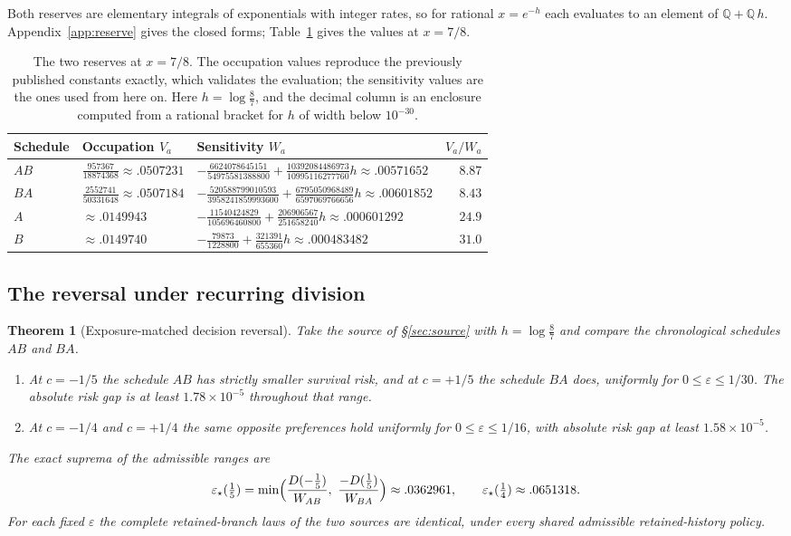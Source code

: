 \documentclass[11pt]{article}
\theoremstyle{plain}
\newtheorem{theorem}{Theorem}
\theoremstyle{definition}
\theoremstyle{remark}
\newcommand{\eps}{\varepsilon}
\begin{document}
Both reserves are elementary integrals of exponentials with integer rates, so
for rational $x=e^{-h}$ each evaluates to an element of
$\mathbb Q+\mathbb Q\,h$. Appendix~\ref{app:reserve} gives the closed forms;
Table~\ref{tab:reserves} gives the values at $x=7/8$.

\begin{table}[tb]
\centering\small
\caption{The two reserves at $x=7/8$. The occupation values reproduce the
previously published constants exactly, which validates the evaluation; the
sensitivity values are the ones used from here on. Here $h=\log\frac87$, and
the decimal column is an enclosure computed from a rational bracket for $h$ of
width below $10^{-30}$.}
\label{tab:reserves}
\begin{tabularx}{\linewidth}{@{}llXr@{}}
\toprule
Schedule & Occupation $V_a$ & Sensitivity $W_a$ & $V_a/W_a$\\\midrule
$AB$ & $\frac{957367}{18874368}\approx.0507231$
     & $-\frac{6624078645151}{54975581388800}+\frac{10392084486973}{10995116277760}h\approx.00571652$ & $8.87$\\[2pt]
$BA$ & $\frac{2552741}{50331648}\approx.0507184$
     & $-\frac{520588799010593}{3958241859993600}+\frac{6795050968489}{6597069766656}h\approx.00601852$ & $8.43$\\[2pt]
$A$  & $\approx.0149943$
     & $-\frac{11540424829}{105696460800}+\frac{206906567}{251658240}h\approx.000601292$ & $24.9$\\[2pt]
$B$  & $\approx.0149740$
     & $-\frac{79873}{1228800}+\frac{321391}{655360}h\approx.000483482$ & $31.0$\\
\bottomrule
\end{tabularx}
\end{table}

\subsection{The reversal under recurring division}

\begin{theorem}[Exposure-matched decision reversal]\label{thm:pulse}
Take the source of \S\ref{sec:source} with $h=\log\frac87$ and compare the
chronological schedules $AB$ and $BA$.
\begin{enumerate}[nosep,leftmargin=*]
\item At $c=-1/5$ the schedule $AB$ has strictly smaller survival risk, and at
      $c=+1/5$ the schedule $BA$ does, uniformly for $0\le\eps\le1/30$. The
      absolute risk gap is at least $1.78\times10^{-5}$ throughout that range.
\item At $c=-1/4$ and $c=+1/4$ the same opposite preferences hold uniformly for
      $0\le\eps\le1/16$, with absolute risk gap at least $1.58\times10^{-5}$.
\end{enumerate}
The exact suprema of the admissible ranges are
\[
 \eps_\star(\tfrac15)=\min\Bigl(\frac{D(-\tfrac15)}{W_{AB}},\ \frac{-D(\tfrac15)}{W_{BA}}\Bigr)
 \approx.0362961 ,
 \qquad
 \eps_\star(\tfrac14)\approx.0651318 .
\]
For each fixed $\eps$ the complete retained-branch laws of the two sources are
identical, under every shared admissible retained-history policy.
\end{theorem}
\end{document}
